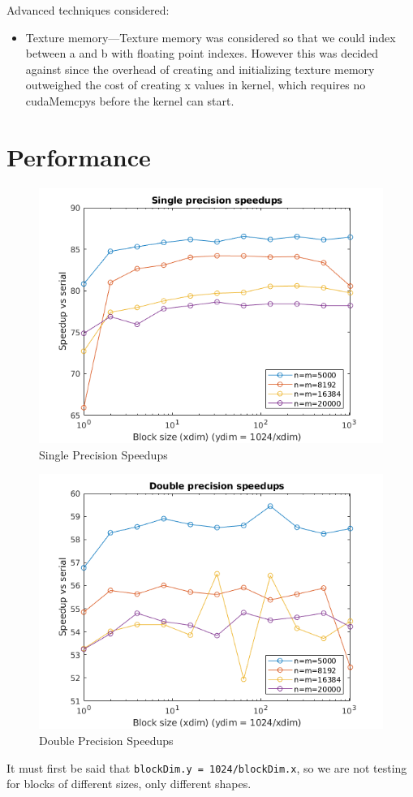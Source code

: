 \documentclass[a4paper, fleqn]{article}
\begin{document}
        Advanced techniques considered:
        \begin{itemize}
        \item Texture memory---Texture memory was considered so that we could index between a and b with floating point indexes. However this was decided against since the overhead of creating and initializing texture memory outweighed the cost of creating x values in kernel, which requires no cudaMemcpys before the kernel can start.
        \end{itemize}
\section{Performance}%
\label{sec:performance}

\begin{figure}[hbt!]
        \centering
        \includegraphics[width=0.8\linewidth]{../single.png}
        \caption{Single Precision Speedups}%
        \label{fig:../single}
\end{figure}
\begin{figure}[hbt!]
        \centering
        \includegraphics[width=0.8\linewidth]{../double.png}
        \caption{Double Precision Speedups}%
        \label{fig:../double}
\end{figure}
It must first be said that \texttt{blockDim.y = 1024/blockDim.x}, so we are not testing for blocks of different sizes, only different shapes. 
\end{document}
